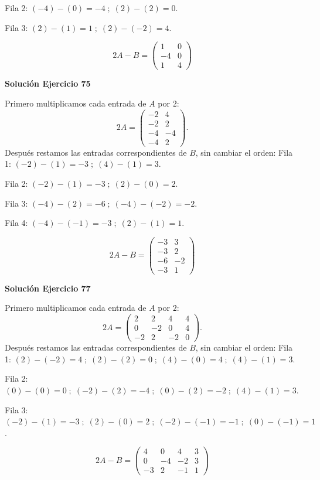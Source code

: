 Fila 2: $(-4)-(0)=-4\; ;\; (2)-(2)=0$.

Fila 3: $(2)-(1)=1\; ;\; (2)-(-2)=4$.

\[
\boxed{2A-B=\begin{pmatrix}1&0\\-4&0\\1&4\end{pmatrix}}
\]

\par\bigskip\noindent\textbf{Solución Ejercicio 75}\par\nobreak
Primero multiplicamos cada entrada de $A$ por $2$:
\[
2A=\begin{pmatrix}-2&4\\-2&2\\-4&-4\\-4&2\end{pmatrix}.
\]
Después restamos las entradas correspondientes de $B$, sin cambiar el orden:
Fila 1: $(-2)-(1)=-3\; ;\; (4)-(1)=3$.

Fila 2: $(-2)-(1)=-3\; ;\; (2)-(0)=2$.

Fila 3: $(-4)-(2)=-6\; ;\; (-4)-(-2)=-2$.

Fila 4: $(-4)-(-1)=-3\; ;\; (2)-(1)=1$.

\[
\boxed{2A-B=\begin{pmatrix}-3&3\\-3&2\\-6&-2\\-3&1\end{pmatrix}}
\]

\par\bigskip\noindent\textbf{Solución Ejercicio 77}\par\nobreak
Primero multiplicamos cada entrada de $A$ por $2$:
\[
2A=\begin{pmatrix}2&2&4&4\\0&-2&0&4\\-2&2&-2&0\end{pmatrix}.
\]
Después restamos las entradas correspondientes de $B$, sin cambiar el orden:
Fila 1: $(2)-(-2)=4\; ;\; (2)-(2)=0\; ;\; (4)-(0)=4\; ;\; (4)-(1)=3$.

Fila 2: $(0)-(0)=0\; ;\; (-2)-(2)=-4\; ;\; (0)-(2)=-2\; ;\; (4)-(1)=3$.

Fila 3: $(-2)-(1)=-3\; ;\; (2)-(0)=2\; ;\; (-2)-(-1)=-1\; ;\; (0)-(-1)=1$.

\[
\boxed{2A-B=\begin{pmatrix}4&0&4&3\\0&-4&-2&3\\-3&2&-1&1\end{pmatrix}}
\]

